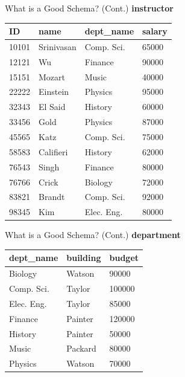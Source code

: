 \documentclass[aspectratio=169, xcolor=dvipsnames]{beamer}
\begin{document}
\begin{frame}{What is a Good Schema? (Cont.)}
    \textbf{instructor}
    \begin{center}
    \begin{tabular}{|l|l|l|l|}
    \hline
    \textbf{ID} & \textbf{name} & \textbf{dept\_name} & \textbf{salary} \\ \hline
    10101 & Srinivasan & Comp. Sci. & 65000 \\ 
    12121 & Wu & Finance & 90000 \\ 
    15151 & Mozart & Music & 40000 \\ 
    22222 & Einstein & Physics & 95000 \\ 
    32343 & El Said & History & 60000 \\ 
    33456 & Gold & Physics & 87000 \\ 
    45565 & Katz & Comp. Sci. & 75000 \\ 
    58583 & Califieri & History & 62000 \\ 
    76543 & Singh & Finance & 80000 \\ 
    76766 & Crick & Biology & 72000 \\ 
    83821 & Brandt & Comp. Sci. & 92000 \\ 
    98345 & Kim & Elec. Eng. & 80000 \\ \hline
    \end{tabular}
    \end{center}
\end{frame}

\begin{frame}{What is a Good Schema? (Cont.)}
    \textbf{department}
    \begin{center}
    \begin{tabular}{|l|l|l|}
    \hline
    \textbf{dept\_name} & \textbf{building} & \textbf{budget} \\ \hline
    Biology & Watson & 90000 \\ 
    Comp. Sci. & Taylor & 100000 \\ 
    Elec. Eng. & Taylor & 85000 \\ 
    Finance & Painter & 120000 \\ 
    History & Painter & 50000 \\ 
    Music & Packard & 80000 \\ 
    Physics & Watson & 70000 \\ \hline
    \end{tabular}
    \end{center}
\end{frame}
\end{document}
